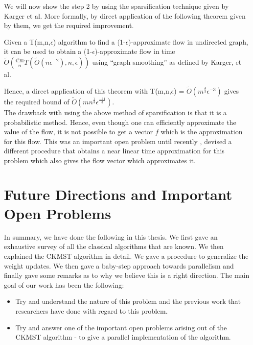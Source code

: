 \documentclass[BTech]{iitmdiss}
\begin{document}
		We will now show the step 2 by using the sparsification technique given by Karger et al. More formally, by direct application of the 
		following theorem given by them, we get the required improvement. 
		
		\begin{thm}
		 Given a T(m,n,$\epsilon$) algorithm to find a (1-$\epsilon$)-approximate flow in undirected graph, it can be used to obtain 
		 a (1-$\epsilon$)-approximate flow in time $\widetilde{O}(\frac{\epsilon^2 m}{n}T(\widetilde{O}(n \epsilon^{-2}),n,\epsilon))$ using 
		 ``graph smoothing'' as defined by Karger, et al.
		\end{thm}

		Hence, a direct application of this theorem with T(m,n,$\epsilon$) = $\widetilde{O}(m^{\frac{4}{3}} \epsilon^{-3})$ gives 
		the required bound of $\widetilde{O}(mn^{\frac{1}{3}} \epsilon^{\frac{-11}{3}})$. \\
		
		The drawback with using the above method of sparsification is that it is a probabilistic method. Hence, even though one can efficiently
		approximate the value of the flow, it is not possible to get a vector $f$ which is the approximation for this flow. This was an important
		open problem until recently \cite{DBLP:journals/corr/abs-1304-2338}, devised a different procedure that obtains a near linear time approximation for this
		problem which also gives the flow vector which approximates it. 
		
		\chapter{Future Directions and Important Open Problems}
		  In summary, we have done the following in this thesis. We first gave an exhaustive survey of all the classical algorithms that are known.
		  We then explained the CKMST algorithm in detail. We gave a procedure to generalize the weight updates. We then gave a baby-step
		  approach towards parallelism and finally gave some remarks as to why we believe this is a right direction. The main goal of our work
		  has been the following:
		  \begin{itemize}
		   \item 
		    Try and understand the nature of this problem and the previous work that researchers have done with regard to this problem.
		   \item
		    Try and answer one of the important open problems arising out of the CKMST algorithm - to give a parallel implementation of 
		    the algorithm.
		  \end{itemize}
\end{document}
